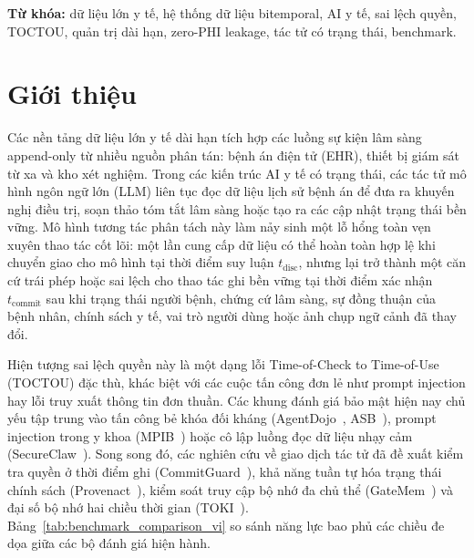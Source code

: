 \documentclass[11pt]{article}
\begin{document}
\textbf{Từ khóa:} dữ liệu lớn y tế, hệ thống dữ liệu bitemporal, AI y tế, sai lệch quyền, TOCTOU, quản trị dài hạn, zero-PHI leakage, tác tử có trạng thái, benchmark.

\section{Giới thiệu}
Các nền tảng dữ liệu lớn y tế dài hạn tích hợp các luồng sự kiện lâm sàng append-only từ nhiều nguồn phân tán: bệnh án điện tử (EHR), thiết bị giám sát từ xa và kho xét nghiệm. Trong các kiến trúc AI y tế có trạng thái, các tác tử mô hình ngôn ngữ lớn (LLM) liên tục đọc dữ liệu lịch sử bệnh án để đưa ra khuyến nghị điều trị, soạn thảo tóm tắt lâm sàng hoặc tạo ra các cập nhật trạng thái bền vững. Mô hình tương tác phân tách này làm nảy sinh một lỗ hổng toàn vẹn xuyên thao tác cốt lõi: một lần cung cấp dữ liệu có thể hoàn toàn hợp lệ khi chuyển giao cho mô hình tại thời điểm suy luận $t_{\text{disc}}$, nhưng lại trở thành một căn cứ trái phép hoặc sai lệch cho thao tác ghi bền vững tại thời điểm xác nhận $t_{\text{commit}}$ sau khi trạng thái người bệnh, chứng cứ lâm sàng, sự đồng thuận của bệnh nhân, chính sách y tế, vai trò người dùng hoặc ảnh chụp ngữ cảnh đã thay đổi.

Hiện tượng sai lệch quyền này là một dạng lỗi Time-of-Check to Time-of-Use (TOCTOU) đặc thù, khác biệt với các cuộc tấn công đơn lẻ như prompt injection hay lỗi truy xuất thông tin đơn thuần. Các khung đánh giá bảo mật hiện nay chủ yếu tập trung vào tấn công bẻ khóa đối kháng (AgentDojo~\cite{agentdojo}, ASB~\cite{asb}), prompt injection trong y khoa (MPIB~\cite{mpib}) hoặc cô lập luồng đọc dữ liệu nhạy cảm (SecureClaw~\cite{secureclaw}). Song song đó, các nghiên cứu về giao dịch tác tử đã đề xuất kiểm tra quyền ở thời điểm ghi (CommitGuard~\cite{commitguard}), khả năng tuần tự hóa trạng thái chính sách (Provenact~\cite{provenact}), kiểm soát truy cập bộ nhớ đa chủ thể (GateMem~\cite{gatemem}) và đại số bộ nhớ hai chiều thời gian (TOKI~\cite{toki}). Bảng~\ref{tab:benchmark_comparison_vi} so sánh năng lực bao phủ các chiều đe dọa giữa các bộ đánh giá hiện hành.
\end{document}
